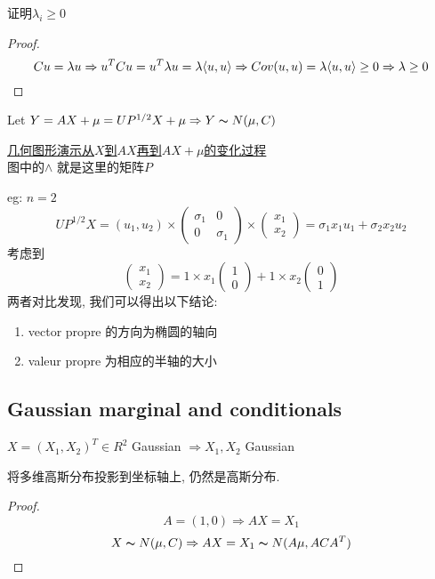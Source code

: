 \documentclass{article}
\begin{document}
证明$\lambda_i \geq 0$
\begin{proof}
$$Cu = \lambda u \Rightarrow u^T C u = u^T \lambda u = \lambda \langle u , u\rangle \Rightarrow Cov(u,u) = \lambda \langle u , u\rangle \geq 0 \Rightarrow \lambda \geq 0$$
\end{proof}

Let $Y = A X + \mu = U P^{1/2} X + \mu \Rightarrow Y \thicksim{N}(\mu, C)$

\href{http://i.imgbox.com/9t3eUww4.png}{几何图形演示从$X$到$AX$再到$AX+\mu$的变化过程}\\
图中的$\wedge$ 就是这里的矩阵$P$

eg: $n = 2$\\
$$
U P^{1/2} X
=
(u_1, u_2)
\times
\begin{pmatrix}
\sigma_1 & 0 \\
0 & \sigma_1
\end{pmatrix}
\times
\begin{pmatrix}
x_1\\
x_2
\end{pmatrix}
=
\sigma_1 x_1 u_1 + \sigma_2 x_2 u_2
$$
考虑到
$$
\begin{pmatrix}
x_1\\
x_2
\end{pmatrix}
=
1 \times x_1
\begin{pmatrix}
1\\
0
\end{pmatrix}
+
1 \times x_2
\begin{pmatrix}
0\\
1
\end{pmatrix}
$$
两者对比发现, 我们可以得出以下结论:
\begin{enumerate}
\item vector propre 的方向为椭圆的轴向
\item valeur propre 为相应的半轴的大小
\end{enumerate}

\subsection{Gaussian marginal and conditionals}
\begin{theorem}
$X = (X_1, X_2)^T \in R^2$ Gaussian $\Rightarrow X_1, X_2$ Gaussian
\end{theorem}
将多维高斯分布投影到坐标轴上, 仍然是高斯分布.
\begin{proof}
$$A = (1, 0) \Rightarrow AX = X_1$$
$$X \thicksim{N}(\mu, C) \Rightarrow AX = X_1 \thicksim{N}(A\mu, ACA^T)$$
\end{proof}
\end{document}
